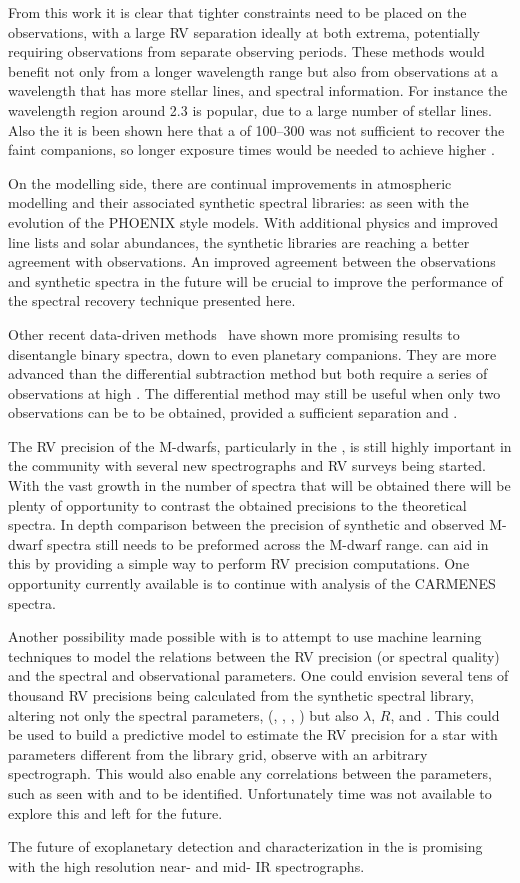 From this work it is clear that tighter constraints need to be placed on the observations, with a large {RV} separation ideally at both extrema, potentially requiring observations from separate observing periods.
These methods would benefit not only from a longer wavelength range but also from observations at a wavelength that has more stellar lines, and spectral information.
For instance the wavelength region around 2.3\um{} is popular, due to a large number of stellar  lines.
Also the \snr{} it is been shown here that a \snr{} of 100--300 was not sufficient to recover the faint companions, so longer exposure times would be needed to achieve higher \snr{}.

On the modelling side, there are continual improvements in atmospheric modelling and their associated synthetic spectral libraries: as seen with the evolution of the PHOENIX style models.
With additional physics and improved line lists and solar abundances, the synthetic libraries are reaching a better agreement with \nir{} observations.
An improved agreement between the \nir{} observations and synthetic spectra in the future will be crucial to improve the performance of the spectral recovery technique presented here.

Other recent data-driven methods~\citep[e.g.][]{piskorz_evidence_2016, czekala_disentangling_2017} have shown more promising results to disentangle binary spectra, down to even planetary companions.
They are more advanced than the differential subtraction method but both require a series of observations at high \snr{}.
The differential method may still be useful when only two observations can be to be obtained, provided a sufficient separation and \snr{}.

The {RV} precision of the M-dwarfs, particularly in the \nir{}, is still highly important in the community with several new \nir{} spectrographs and {RV} surveys being started.
With the vast growth in the number of \nir{} spectra that will be obtained there will be plenty of opportunity to contrast the obtained precisions to the theoretical spectra.
In depth comparison between the precision of synthetic and observed M-dwarf spectra still needs to be preformed across the M-dwarf range.
\eniric{} can aid in this by providing a simple way to perform {RV} precision computations.
One opportunity currently available is to continue with analysis of the {CARMENES} spectra.

Another possibility made possible with \eniric{} is to attempt to use machine learning techniques to model the relations between the {RV} precision (or spectral quality) and the spectral and observational parameters.
One could envision several tens of thousand {RV} precisions being calculated from the synthetic spectral library, altering not only the spectral parameters, (\Teff, \Logg{}, \feh{}, \alphafe{}) but also \(\lambda\), \(R\), \Vsini{} and \snr{}.
This could be used to build a predictive model to estimate the {RV} precision for a star with parameters different from the library grid, observe with an arbitrary spectrograph.
This would also enable any correlations between the parameters, such as seen with \Logg{} and \feh{} to be identified.
Unfortunately time was not available to explore this and left for the future.

The future of exoplanetary detection and characterization in the \nir{} is promising with the high resolution near- and mid- IR spectrographs.

